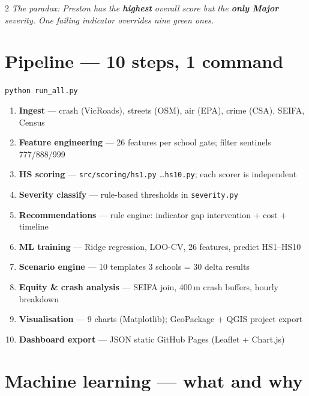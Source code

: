 \documentclass[9pt,a4paper]{extarticle}
\newcommand{\kw}[1]{\textbf{\color{DG}#1}}
\newcommand{\bad}[1]{\textbf{\color{RED}#1}}
\begin{document}
\begin{multicols}{2}
\vspace{2pt}
\textit{\small The paradox: Preston has the \bad{highest} overall score but the \bad{only Major} severity. One failing indicator overrides nine green ones.}

\section{Pipeline --- 10 steps, 1 command}

\texttt{\small python run\_all.py}

\begin{enumerate}
  \item \kw{Ingest} --- crash (VicRoads), streets (OSM), air (EPA), crime (CSA), SEIFA, Census
  \item \kw{Feature engineering} --- 26 features per school gate; filter sentinels 777/888/999
  \item \kw{HS scoring} --- \texttt{src/scoring/hs1.py} \ldots \texttt{hs10.py}; each scorer is independent
  \item \kw{Severity classify} --- rule-based thresholds in \texttt{severity.py}
  \item \kw{Recommendations} --- rule engine: indicator gap \textrightarrow{} intervention + cost + timeline
  \item \kw{ML training} --- Ridge regression, LOO-CV, 26 features, predict HS1--HS10
  \item \kw{Scenario engine} --- 10 templates \texttimes{} 3 schools = 30 delta results
  \item \kw{Equity \& crash analysis} --- SEIFA join, 400\,m crash buffers, hourly breakdown
  \item \kw{Visualisation} --- 9 charts (Matplotlib); GeoPackage + QGIS project export
  \item \kw{Dashboard export} --- JSON \textrightarrow{} static GitHub Pages (Leaflet + Chart.js)
\end{enumerate}

\columnbreak

\section{Machine learning --- what and why}


\end{multicols}
\end{document}
